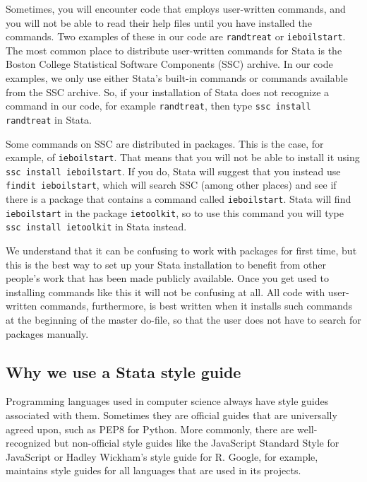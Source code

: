 Sometimes, you will encounter code that employs user-written commands,
and you will not be able to read their help files until you have installed the commands.
Two examples of these in our code are \texttt{randtreat} or \texttt{ieboilstart}.
The most common place to distribute user-written commands for Stata
is the Boston College Statistical Software Components (SSC) archive.
In our code examples, we only use either Stata's built-in commands or commands available from the
SSC archive.
So, if your installation of Stata does not recognize a command in our code, for example
\texttt{randtreat}, then type \texttt{ssc install randtreat} in Stata.

Some commands on SSC are distributed in packages.
This is the case, for example, of \texttt{ieboilstart}.
That means that you will not be able to install it using \texttt{ssc install ieboilstart}.
If you do, Stata will suggest that you instead use \texttt{findit ieboilstart},
which will search SSC (among other places) and see if there is a
package that contains a command called \texttt{ieboilstart}.
Stata will find \texttt{ieboilstart} in the package \texttt{ietoolkit},
so to use this command you will type \texttt{ssc install ietoolkit} in Stata instead.

We understand that it can be confusing to work with packages for first time,
but this is the best way to set up your Stata installation to benefit from other
people's work that has been made publicly available.
Once you get used to installing commands like this it will not be confusing at all.
All code with user-written commands, furthermore, is best written when it installs such commands
at the beginning of the master do-file,
so that the user does not have to search for packages manually.

\subsection{Why we use a Stata style guide}

Programming languages used in computer science always have style guides associated with them.
Sometimes they are official guides that are universally agreed upon, such as PEP8 for
Python. More commonly, there are well-recognized but
non-official style guides like the JavaScript Standard Style for
JavaScript or Hadley Wickham's style guide for R.
Google, for example, maintains style guides for all languages
that are used in its projects.

